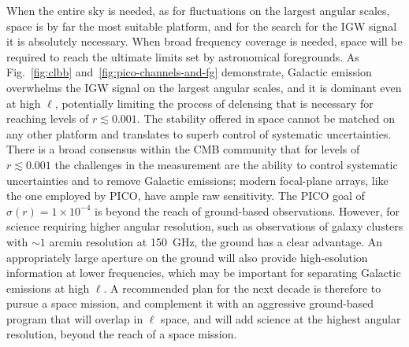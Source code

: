 \documentclass[PICOReport.tex]{subfiles}
\begin{document}
When the entire sky is needed, as for fluctuations on the largest angular scales, space is by far the most suitable platform, and for the search for the \ac{IGW} signal it is absolutely necessary. When broad frequency coverage is needed, space will be required to reach the ultimate limits set by astronomical foregrounds.  As Fig.~\ref{fig:clbb} and~\ref{fig:pico-channels-and-fg} demonstrate, Galactic emission overwhelms the \ac{IGW} signal on the largest angular scales, and it is dominant even at high $\ell$, potentially limiting the process of delensing that is necessary for reaching levels of $r\lesssim0.001$. The stability offered in space cannot be matched on any other platform and translates to superb control of systematic uncertainties. There is a broad consensus within the CMB community that for levels of $r \lesssim 0.001$ the challenges in the measurement are the ability to control systematic uncertainties and to remove Galactic emissions; modern focal-plane arrays, like the one employed by PICO, have ample raw sensitivity. The PICO goal of $\sigma(r)=1\times10^{-4}$ is beyond the reach of ground-based observations.  However, for science requiring higher angular resolution, such as observations of galaxy clusters with $\sim1$ arcmin resolution at 150~GHz, the ground has a clear advantage. An appropriately large aperture on the ground will also provide high-esolution information at lower frequencies, which may be important for separating Galactic emissions at high $\ell$. 
A recommended plan for the next decade is therefore to pursue a space mission, and complement it with an aggressive ground-based program that will overlap in $\ell$ space, and will add science at the highest angular resolution, beyond the reach of a space mission. 

\end{document}
